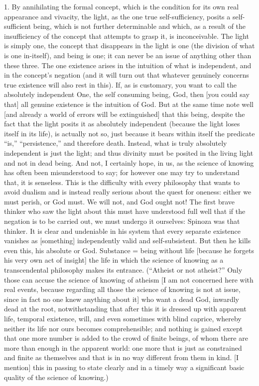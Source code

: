 1. By annihilating the formal concept,
which is the condition for its own
real appearance and vivacity,
the light, as the one true self-sufficiency,
posits a self-sufficient being,
which is not further determinable and
which, as a result of
the insufficiency of the concept
that attempts to grasp it,
is inconceivable.
The light is simply one,
the concept that disappears in the light is one
(the division of what is one in-itself),
and being is one;
it can never be an issue of
anything other than these three.
The one existence arises in
the intuition of what is independent,
and in the concept's negation
(and it will turn out that whatever genuinely concerns
true existence will also rest in this).
If, as is customary, you want to call
the absolutely independent One,
the self consuming being, God,
then [you could say that] all
genuine existence is the intuition of God.
But at the same time note well
[and already a world of errors will be extinguished]
that this being, despite the fact that
the light posits it as absolutely independent
(because the light loses itself in its life),
is actually not so, just because it bears within itself
the predicate “is,” “persistence,” and therefore death.
Instead, what is truly absolutely
independent is just the light;
and thus divinity must be posited
in the living light and not in dead being.
And not, I certainly hope, in us, as
the science of knowing has
often been misunderstood to say;
for however one may try to understand that,
it is senseless.
This is the difficulty with every philosophy
that wants to avoid dualism
and is instead really serious about
the quest for oneness:
either we must perish, or God must.
We will not, and God ought not!
The first brave thinker
who saw the light about this
must have understood full well that
if the negation is to be carried out,
we must undergo it ourselves:
Spinoza was that thinker.
It is clear and undeniable in his system
that every separate existence vanishes
as [something] independently valid and self-subsistent.
But then he kills even this, his absolute or God.
Substance = being without life
[because he forgets his very own act of insight]
the life in which the science of knowing
as a transcendental philosophy makes its entrance.
(“Atheist or not atheist?”
Only those can accuse the science of knowing of atheism
[I am not concerned here with real events,
because regarding all those the science of knowing is not at issue,
since in fact no one knew anything about it]
who want a dead God, inwardly dead at the root,
notwithstanding that after this it is dressed up
with apparent life, temporal existence, will,
and even sometimes with blind caprice,
whereby neither its life nor ours becomes comprehensible;
and nothing is gained except that one more
number is added to the crowd of finite beings,
of whom there are more than enough in the apparent world:
one more that is just as constrained and finite as themselves
and that is in no way different from them in kind.
[I mention] this in passing to state clearly and in a timely way
a significant basic quality of the science of knowing.)

